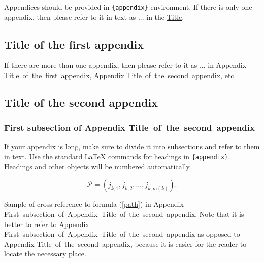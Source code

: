 \documentclass[qe,nameyear,draft]{econsocart}
\theoremstyle{plain}
\theoremstyle{remark}
\begin{document}
\begin{appendix}
Appendices should be provided in \texttt{\{appendix\}} environment. If there is only one appendix,
then please refer to it in text as ... in the \href{/}{Title}.

\subsection{Title of the first appendix}\label{appA}

If there are more than one appendix, then please refer to it
as ... in Appendix Title~of~the~first~appendix, Appendix Title~of~the~second~appendix, etc.

\subsection{Title of the second appendix}\label{appB}

\subsubsection{First subsection of Appendix Title~of~the~second~appendix}\label{appB1}

If your appendix is long, make sure to divide it into subsections and refer to them in text. Use the standard LaTeX commands for headings in \texttt{\{appendix\}}.
Headings and other objects will be numbered automatically.

\begin{equation}
\label{path}
\mathcal{P}=(j_{k,1},j_{k,2},\dots,j_{k,m(k)}).
\end{equation}

Sample of cross-reference to formula (\ref{path}) in Appendix First~subsection~of~Appendix~Title~of~the~second~appendix.
Note that it is better to refer to Appendix First~subsection~of~Appendix~Title~of~the~second~appendix as opposed to Appendix Title~of~the~second~appendix, because it is easier for the reader to locate the necessary place.
\end{appendix}





\end{document}

